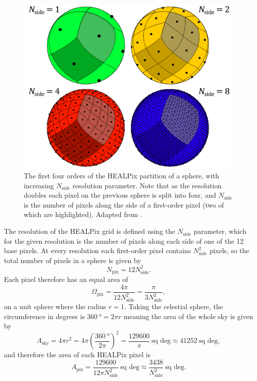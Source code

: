 \begin{colsection}
\begin{colsection}
\begin{figure}[t]
    \begin{center}
        \includegraphics[width=0.7\linewidth]{images/healpix.pdf} %
    \end{center}
    \caption[HEALPix partitions of a sphere]{
        The first four orders of the HEALPix partition of a sphere, with increasing $N_\text{side}$ resolution parameter. Note that as the resolution doubles each pixel on the previous sphere is split into four, and $N_\text{side}$ is the number of pixels along the side of a first-order pixel (two of which are highlighted). Adapted from \citet{HEALPix}.
    }\label{fig:healpix}
\end{figure}

The resolution of the HEALPix grid is defined using the $N_\text{side}$ parameter, which for the given resolution is the number of pixels along each side of one of the 12 base pixels. At every resolution each first-order pixel contains $N_\text{side}^2$ pixels, so the total number of pixels in a sphere is given by
%
\begin{equation}
    N_\text{pix} = 12 N_\text{side}^2.
    \label{eq:healpix_npix}
\end{equation}
%
Each pixel therefore has an equal area of
%
\begin{equation}
    \Omega_\text{pix} = \frac{4\pi}{12 N_\text{side}^2} = \frac{\pi}{3 N_\text{side}^2},
    \label{eq:healpix_area}
\end{equation}
%
on a unit sphere where the radius $r=1$. Taking the celestial sphere, the circumference in degrees is $\SI{360}{\degree} = 2 \pi r$ meaning the area of the whole sky is given by
%
\begin{equation}
    A_\text{sky} = 4 \pi r^2 = 4 \pi \left ( \frac{\SI{360}{\degree}}{2 \pi} \right )^2 = \frac{129600}{\pi}~\text{sq deg} \approx 41252~\text{sq deg} , %
    \label{eq:sky_area}
\end{equation}
%
and therefore the area of each HEALPix pixel is
%
\begin{equation}
    A_\text{pix} = \frac{129600}{12 \pi N_\text{side}^2}~\text{sq~deg} \approx \frac{3438}{N_\text{side}^2}~\text{sq~deg}.
    \label{eq:healpix_area_degrees}
\end{equation}


\end{colsection}
\end{colsection}
